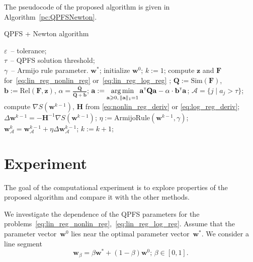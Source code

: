 \documentclass[a4paper,12pt]{article}
\renewcommand{\geq}{\ensuremath{\geqslant}}
\theoremstyle{plain} %
\theoremstyle{definition} %
\theoremstyle{remark} %
\newcommand{\ba}{\mathbf{a}}
\newcommand{\bb}{\mathbf{b}}
\newcommand{\bw}{\mathbf{w}}
\newcommand{\bz}{\mathbf{z}}
\newcommand{\cA}{\mathcal{A}}
\newcommand{\bQ}{\mathbf{Q}}
\newcommand{\bH}{\mathbf{H}}
\newcommand{\bF}{\mathbf{F}}
\newcommand{\T}{{\text{\tiny\sffamily\upshape\mdseries T}}}
\newcommand{\argmin}{\mathop{\arg \min}\limits}
\begin{document}
The pseudocode of the proposed algorithm is given in Algorithm~\ref{pc:QPFSNewton}.

\begin{algorithm}
	\caption{QPFS + Newton algorithm}
	\label{pc:QPFSNewton}
	\begin{algorithmic}
		\REQUIRE $\varepsilon$~-- tolerance;\\
		\hspace{1.07cm}$\tau$~-- QPFS solution threshold;\\
		\hspace{1.07cm}$\gamma$~-- Armijo rule parameter.
		\ENSURE $\bw^*$;
		\STATE  initialize $\bw^0$;
		\STATE $k := 1$;
		\REPEAT
		\STATE compute $\bz$ and $\bF$ for~\eqref{eq:lin_reg_nonlin_reg} or~\eqref{eq:lin_reg_log_reg} ;
		\vspace{0.1cm}
		\STATE $\bQ := \text{Sim} (\bF)$, $\bb := \text{Rel}(\bF, \bz)$, $\alpha = \frac{\overline{\bQ}}{\overline{\bQ} + \overline{\bb}}$;
		\vspace{0.1cm}
		\STATE $\ba := \argmin_{\ba \geq 0, \, \|\ba\|_1=1}\ba^{\T} \bQ \ba - \alpha \cdot \mathbf{b}^{\T} \ba$;
		\vspace{0.1cm}
		\STATE $\cA = \{j \mid a_j > \tau\}$;
		\vspace{0.1cm}
		\STATE compute $\nabla S(\bw^{k-1})$, $\bH$ from \eqref{eq:nonlin_reg_deriv} or \eqref{eq:log_reg_deriv};
		\vspace{0.1cm}
		\STATE $\Delta \bw^{k-1} = - \bH^{-1} \nabla S(\bw^{k-1})$;
		\vspace{0.1cm}
		\STATE $\eta := \text{ArmijoRule}(\bw^{k-1}, \gamma)$;
		\vspace{0.1cm}
		\STATE $\bw_{\cA}^k = \bw_{\cA}^{k - 1} + \eta \Delta \bw_{\cA}^{k - 1}$;
		\vspace{0.1cm}
		\STATE $k := k + 1$;
		\vspace{0.1cm}
		\UNTIL{$\frac{\| \bw^k - \bw^{k-1} \|}{\| \bw^k \|} < \varepsilon$}
	\end{algorithmic}
\end{algorithm}


  	\section*{Experiment}
The goal of the computational experiment is to explore properties of the proposed algorithm and compare it with the other methods. 

We investigate the dependence of the QPFS parameters for the problems~\eqref{eq:lin_reg_nonlin_reg},~\eqref{eq:lin_reg_log_reg}. 
Assume that the parameter vector~$\bw^0$ lies near the optimal parameter vector~$\bw^*$. 
We consider a line segment
\[
\bw_{\beta} = \beta \bw^* + (1 - \beta) \bw^0; \, \beta \in [0, 1] .
\]
\end{document}
